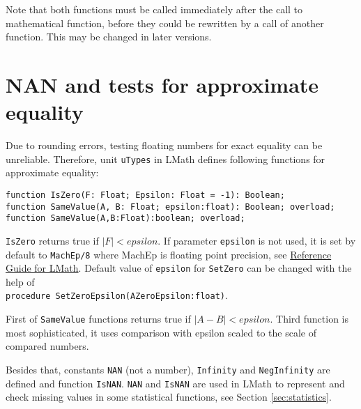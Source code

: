 \documentclass[12pt,a4paper,oneside]{article}
\newcommand{\code}[1]{\texttt{#1}}
\begin{document}
\noindent Note that both functions must be called immediately after the call to mathematical function, before they could be rewritten by a call of another function. This may be changed in later versions.
\section{NAN and tests for approximate equality}
Due to rounding errors, testing floating numbers for exact equality can be unreliable. Therefore, unit \code{uTypes} in LMath defines following functions for approximate equality:
\begin{verbatim}
function IsZero(F: Float; Epsilon: Float = -1): Boolean;
function SameValue(A, B: Float; epsilon:float): Boolean; overload;
function SameValue(A,B:Float):boolean; overload;
\end{verbatim}
\code{IsZero} returns true if $\left| F \right| < epsilon$. If parameter \code{epsilon} is not used, it is set by default to \code{MachEp/8} where MachEp is floating point precision, see \hyperref{file:LMath05.pdf}{}{}{Reference Guide for LMath}. Default value of \code{epsilon} for \code{SetZero} can be changed with the help of \\
\code{procedure SetZeroEpsilon(AZeroEpsilon:float)}.

First of \code{SameValue} functions returns true if $\left| A - B \right| < epsilon$. Third function is most sophisticated, it uses comparison with epsilon scaled to the scale of compared numbers. 

Besides that, constants \code{NAN} (not a number), \code{Infinity} and \code{NegInfinity} are defined and function \code{IsNAN}. \code{NAN} and \code{IsNAN} are used in LMath to represent and check missing values in some statistical functions, see Section \ref{sec:statistics}.
\end{document}
